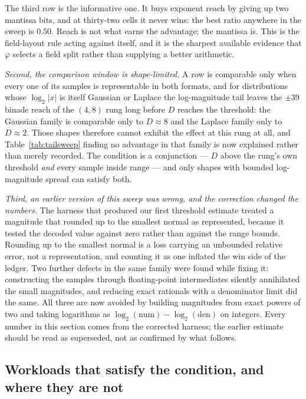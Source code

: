 \documentclass[11pt]{article}
\theoremstyle{definition}
\begin{document}
The third row is the informative one. It buys exponent reach by giving up two
mantissa bits, and at thirty-two cells it never wins: the best ratio anywhere in
the sweep is $0.50$. Reach is not what earns the advantage; the mantissa is. This
is the field-layout rule acting against itself, and it is the sharpest available
evidence that $\varphi$ selects a field split rather than supplying a better
arithmetic.

\emph{Second, the comparison window is shape-limited.} A row is comparable only
when every one of its samples is representable in both formats, and for
distributions whose $\log_2|x|$ is itself Gaussian or Laplace the log-magnitude
tail leaves the $\pm 39$ binade reach of the $(4,8)$ rung long before $D$ reaches
the threshold: the Gaussian family is comparable only to $D \approx 8$ and the
Laplace family only to $D \approx 2$. Those shapes therefore cannot exhibit the
effect at this rung at all, and Table~\ref{tab:tailsweep} finding no advantage in
that family is now explained rather than merely recorded. The condition is a
conjunction --- $D$ above the rung's own threshold \emph{and} every sample inside
range --- and only shapes with bounded log-magnitude spread can satisfy both.

\emph{Third, an earlier version of this sweep was wrong, and the correction
changed the numbers.} The harness that produced our first threshold estimate
treated a magnitude that rounded up to the smallest normal as represented, because
it tested the decoded value against zero rather than against the range bounds.
Rounding up to the smallest normal is a loss carrying an unbounded relative error,
not a representation, and counting it as one inflated the win side of the ledger.
Two further defects in the same family were found while fixing it: constructing
the samples through floating-point intermediates silently annihilated the small
magnitudes, and reducing exact rationals with a denominator limit did the same. All
three are now avoided by building magnitudes from exact powers of two and taking
logarithms as $\log_2(\text{num}) - \log_2(\text{den})$ on integers. Every number
in this section comes from the corrected harness; the earlier estimate should be
read as superseded, not as confirmed by what follows.

\subsection{Workloads that satisfy the condition, and where they are not}
\label{sec:nolanding}
\end{document}

